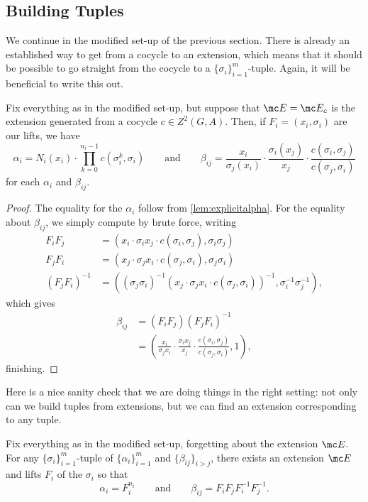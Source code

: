 \documentclass{article}
\numberwithin{equation}{section}
\begin{document}
\subsection{Building Tuples}
We continue in the modified set-up of the previous section. There is already an established way to get from a cocycle to an extension, which means that it should be possible to go straight from the cocycle to a $\{\sigma_i\}_{i=1}^m$-tuple. Again, it will be beneficial to write this out.
\begin{lemma} \label{lem:explicitalphabeta}
	Fix everything as in the modified set-up, but suppose that $\mc E=\mc E_c$ is the extension generated from a cocycle $c\in Z^2( G,A)$. Then, if $F_i=(x_i,\sigma_i)$ are our lifts, we have
	\[\alpha_i=N_i(x_i)\cdot\prod_{k=0}^{n_i-1}c\left(\sigma_i^k,\sigma_i\right)\qquad\text{and}\qquad\beta_{ij}=\frac{x_i}{\sigma_j(x_i)}\cdot\frac{\sigma_i(x_j)}{x_j}\cdot\frac{c(\sigma_i,\sigma_j)}{c(\sigma_j,\sigma_i)}\]
	for each $\alpha_i$ and $\beta_{ij}$.
\end{lemma}
\begin{proof}
	The equality for the $\alpha_i$ follow from \autoref{lem:explicitalpha}. For the equality about $\beta_{ij}$, we simply compute
	by brute force, writing
    \begin{align*}
        F_iF_j &= (x_i\cdot\sigma_ix_j\cdot c(\sigma_i,\sigma_j),\sigma_i\sigma_j) \\
        F_jF_i &= (x_j\cdot\sigma_jx_i\cdot c(\sigma_j,\sigma_i),\sigma_j\sigma_i) \\
        (F_jF_i)^{-1} &= \left((\sigma_j\sigma_i)^{-1}(x_j\cdot\sigma_jx_i\cdot c(\sigma_j,\sigma_i))^{-1},\sigma_i^{-1}\sigma_j^{-1}\right),
    \end{align*}
    which gives
    \begin{align*}
        \beta_{ij} &= (F_iF_j)(F_jF_i)^{-1} \\
        &= \left(\frac{x_i}{\sigma_jx_i}\cdot\frac{\sigma_ix_j}{x_j}\cdot\frac{c(\sigma_i,\sigma_j)}{c(\sigma_j,\sigma_i)},1\right),
    \end{align*}
	finishing.
\end{proof}
Here is a nice sanity check that we are doing things in the right setting: not only can we build tuples from extensions, but we can find an extension corresponding to any tuple.
\begin{cor} \label{cor:alltuplesfromextens}
	Fix everything as in the modified set-up, forgetting about the extension $\mc E$. For any $\{\sigma_i\}_{i=1}^m$-tuple of $\{\alpha_i\}_{i=1}^m$ and $\{\beta_{ij}\}_{i>j}$, there exists an extension $\mc E$ and lifts $F_i$ of the $\sigma_i$ so that
	\[\alpha_i=F_i^{n_i}\qquad\text{and}\qquad\beta_{ij}=F_iF_jF_i^{-1}F_j^{-1}.\]
\end{cor}
\end{document}
